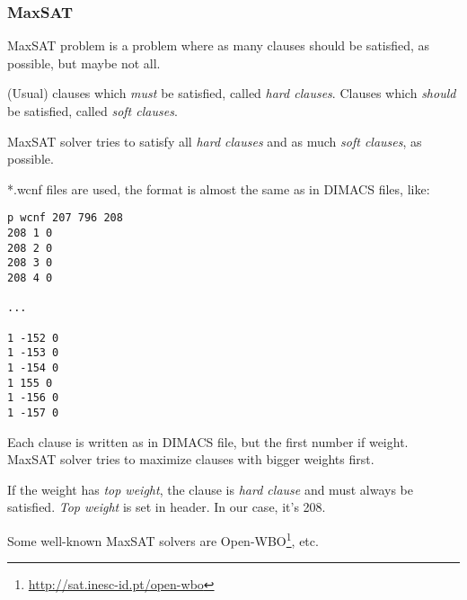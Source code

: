 \subsubsection{MaxSAT}

MaxSAT problem is a problem where as many clauses should be satisfied, as possible, but maybe not all.

(Usual) clauses which \textit{must} be satisfied, called \textit{hard clauses}.
Clauses which \textit{should} be satisfied, called \textit{soft clauses}.

MaxSAT solver tries to satisfy all \textit{hard clauses} and as much \textit{soft clauses}, as possible.

*.wcnf files are used, the format is almost the same as in DIMACS files, like:

\begin{lstlisting}
p wcnf 207 796 208
208 1 0
208 2 0
208 3 0
208 4 0

...

1 -152 0
1 -153 0
1 -154 0
1 155 0
1 -156 0
1 -157 0
\end{lstlisting}

Each clause is written as in DIMACS file, but the first number if weight.
MaxSAT solver tries to maximize clauses with bigger weights first.

If the weight has \textit{top weight}, the clause is \textit{hard clause} and must always be satisfied.
\textit{Top weight} is set in header.
In our case, it's 208.

Some well-known MaxSAT solvers are Open-WBO\footnote{\url{http://sat.inesc-id.pt/open-wbo}}, etc.

